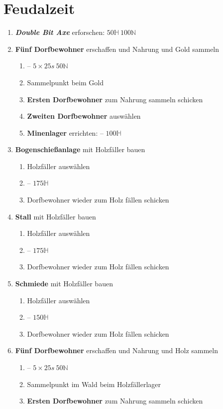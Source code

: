 \documentclass[10pt,twocolumn,a4paper]{article}
\begin{document}
\section{Feudalzeit}
\begin{enumerate}
\item \textbf{\emph{Double Bit Axe}} erforschen: \hfill$50\mathbb H ~ 100\mathbb N$
\item \textbf{Fünf Dorfbewohner} erschaffen und Nahrung und Gold sammeln
	\begin{enumerate}\item {} -- \hfill$5\times 25s~50\mathbb N$\item Sammelpunkt beim Gold\item \textbf{Ersten Dorfbewohner} zum Nahrung sammeln schicken \item \textbf{Zweiten Dorfbewohner} auswählen\item \textbf{Minenlager} errichten:  -- \hfill$100\mathbb H$\end{enumerate}
\item \textbf{Bogenschießanlage} mit Holzfäller bauen \begin{enumerate}\item Holzfäller auswählen\item {} -- \hfill$175\mathbb H$\item Dorfbewohner wieder zum Holz fällen schicken\end{enumerate}
\item \textbf{Stall} mit Holzfäller bauen \begin{enumerate}\item Holzfäller auswählen\item {} -- \hfill$175\mathbb H$\item Dorfbewohner wieder zum Holz fällen schicken\end{enumerate}
\item \textbf{Schmiede} mit Holzfäller bauen \begin{enumerate}\item Holzfäller auswählen\item {} -- \hfill$150\mathbb H$\item Dorfbewohner wieder zum Holz fällen schicken\end{enumerate}
\item \textbf{Fünf Dorfbewohner} erschaffen und Nahrung und Holz sammeln
	\begin{enumerate}\item {} -- \hfill$5\times 25s~50\mathbb N$\item Sammelpunkt im Wald beim Holzfällerlager\item \textbf{Ersten Dorfbewohner} zum Nahrung sammeln schicken\end{enumerate}

\end{enumerate}
\end{document}
